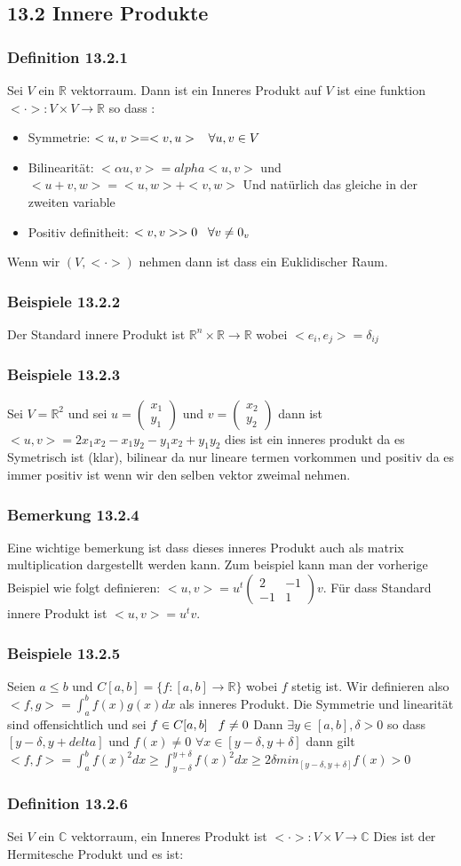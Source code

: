\documentclass{article}
\newcommand{\smspc}{\hspace{0.3cm}}
\newcommand{\beispiel}[1]{\subsubsection*{Beispiele {#1}}}
\newcommand{\bemerkung}[1]{\subsubsection*{Bemerkung {#1}}}
\newcommand{\definition}[1]{\subsubsection*{Definition {#1}}}
\begin{document}
\subsection*{13.2 Innere Produkte}
\definition{13.2.1} Sei $V$ ein $\mathbb{R}$ vektorraum. Dann ist ein Inneres Produkt auf $V$ ist eine funktion $<\cdot>:V\times V\rightarrow\mathbb{R}$ so dass :
\begin{itemize}
  \item{Symmetrie: $<u,v>=<v,u>\smspc\forall u,v\in V$}
  \item{Bilinearität: $<\alpha u,v> = alpha<u,v>$ und $<u+v,w>=<u,w>+<v,w>$ Und natürlich das gleiche in der zweiten variable}
  \item{Positiv definitheit: $<v,v>>0\smspc\forall v\neq0_v$}
\end{itemize}
Wenn wir $(V,<\cdot>)$ nehmen dann ist dass ein Euklidischer Raum.
\beispiel{13.2.2} Der Standard innere Produkt ist $\mathbb{R}^n\times\mathbb{R}\rightarrow\mathbb{R}$ wobei $<e_i,e_j>=\delta_{ij}$
\beispiel{13.2.3}Sei $V=\mathbb{R}^2$ und sei $u=\begin{pmatrix}x_1\\y_1\end{pmatrix}$ und $v=\begin{pmatrix}x_2\\y_2\end{pmatrix}$ dann ist $<u,v>=2x_1x_2-x_1y_2-y_1x_2+y_1y_2$ dies ist ein inneres produkt da es Symetrisch ist (klar), bilinear da nur lineare termen vorkommen und positiv da es immer positiv ist wenn wir den selben vektor zweimal nehmen.
\bemerkung{13.2.4} Eine wichtige bemerkung ist dass dieses inneres Produkt auch als matrix multiplication dargestellt werden kann.
Zum beispiel kann man der vorherige Beispiel wie folgt definieren: $<u,v>=u^t\begin{pmatrix}2&-1\\-1&1\end{pmatrix}v$. Für dass Standard innere Produkt ist $<u,v>=u^tv$.
\beispiel{13.2.5} Seien $a\le b$ und $C[a,b]=\lbrace f:[a,b]\rightarrow\mathbb{R}\rbrace$ wobei $f$ stetig ist. Wir definieren also $<f,g>=\int_a^b f(x)g(x)dx$ als inneres Produkt. Die Symmetrie und linearität sind offensichtlich und sei $f\in C[a,b]\smspc f\neq0$ Dann $\exists y\in [a,b],\delta>0$ so dass 
$[y-\delta,y+delta]$ und $f(x)\neq 0$ $\forall x \in [y-\delta,y+\delta]$  dann gilt $<f,f>=\int_a^b f(x)^2dx\ge\int_{y-\delta}^{y+\delta}f(x)^2dx\ge2\delta min_{[y-\delta,y+\delta]}f(x)>0$
\definition{13.2.6} Sei $V$ ein $\mathbb{C}$ vektorraum, ein Inneres Produkt ist $<\cdot>:V\times V\rightarrow \mathbb{C}$ Dies ist der Hermitesche Produkt und es ist:
\end{document}
